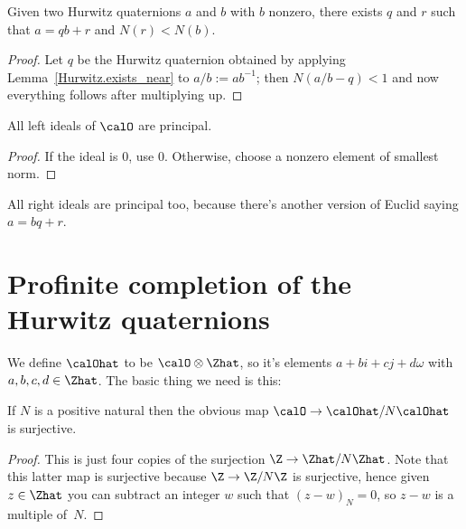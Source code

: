 \begin{lemma}
    \label{Hurwitz.quot_rem}
    \leanok
    Given two Hurwitz quaternions $a$ and $b$ with $b$ nonzero, there exists
    $q$ and $r$ such that $a=qb+r$ and $N(r)<N(b)$.
\end{lemma}
\begin{proof}
    \leanok
  Let $q$ be the Hurwitz quaternion obtained by applying Lemma~\ref{Hurwitz.exists_near}
  to $a/b := ab^{-1}$; then $N(a/b-q)<1$ and now everything follows after multiplying up.
\end{proof}

\begin{corollary}
    \label{Hurwitz.left_ideal_princ}
    \leanok
    All left ideals of $\calO$ are principal.
\end{corollary}
\begin{proof}
    \leanok
    If the ideal is 0, use 0. Otherwise, choose a nonzero element of smallest norm.
\end{proof}

\begin{remark}
    All right ideals are principal too, because there's
    another version of Euclid saying $a=bq+r$.
\end{remark}

\section{Profinite completion of the Hurwitz quaternions}

We define $\calOhat$ to be $\calO\otimes\Zhat$, so it's elements $a+bi+cj+d\omega$
with $a,b,c,d\in\Zhat$. The basic thing we need is this:

\begin{theorem}
    \label{Hurwitz.surjective_pnat_quotient}
    If $N$ is a positive natural then the obvious map $\calO\to\calOhat/N\calOhat$ is surjective.
\end{theorem}
\begin{proof}
    This is just four copies of the surjection $\Z\to\Zhat/N\Zhat$.
    Note that this latter map is surjective because $\Z\to\Z/N\Z$ is surjective,
    hence given $z\in\Zhat$ you can subtract an integer $w$ such
    that $(z-w)_N=0$, so $z-w$ is a multiple of~$N$.
\end{proof}

